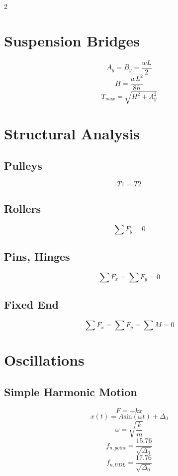 \documentclass[14pt]{article}
\begin{document}
\begin{multicols}{2}
    \section{Suspension Bridges}
    \begin{equation}
        A_y=B_y=\frac{wL}{2}
    \end{equation}
    \begin{equation}
        H=\frac{wL^2}{8h}
    \end{equation}
    \begin{equation}
        T_{max}=\sqrt{H^2+A_y^2}
    \end{equation}
    \section{Structural Analysis}
    \subsection{Pulleys}
    \begin{equation}
        T1=T2
    \end{equation}
    \subsection{Rollers}
    \begin{equation}
        \sum F_y=0
    \end{equation}
    \subsection{Pins, Hinges}
    \begin{equation}
        \sum F_x = \sum F_y = 0
    \end{equation}
    \subsection{Fixed End}
    \begin{equation}
        \sum F_x = \sum F_y = \sum M=0
    \end{equation}
    \section{Oscillations}
    \subsection{Simple Harmonic Motion}
    \begin{equation}
        F=-kx
    \end{equation}
    \begin{equation}
        x(t)=A\text{sin}(\omega t) + \Delta_0
    \end{equation}
    \begin{equation}
        \omega=\sqrt{\frac{k}{m}}
    \end{equation}
    \begin{equation}
        f_{n,point}=\frac{15.76}{\sqrt{\Delta_0}}
    \end{equation}
    \begin{equation}
        f_{n,UDL}=\frac{17.76}{\sqrt{\Delta_0}}
    \end{equation}

\end{multicols}
\end{document}
